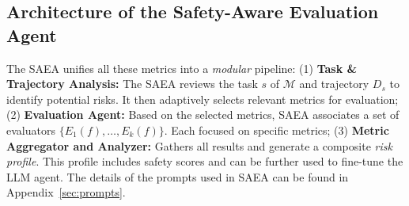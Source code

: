 \subsection{Architecture of the Safety-Aware Evaluation Agent}\label{sec:arch_saea}

The SAEA unifies all these metrics into a \emph{modular} pipeline: (1) \textbf{Task \& Trajectory Analysis:} The SAEA reviews the task $s$ of $\mathcal{M}$ and trajectory $D_s$ to identify potential risks. It then adaptively selects relevant metrics for evaluation; (2) \textbf{Evaluation Agent:} Based on the selected metrics, SAEA associates a set of evaluators $\{E_1(f), \ldots, E_k(f)\}$. Each focused on specific metrics; (3) \textbf{Metric Aggregator and Analyzer:} Gathers all results and generate a composite \emph{risk profile}. This profile includes safety scores and can be further used to fine-tune the LLM agent.
The details of the prompts used in SAEA can be found in Appendix~\ref{sec:prompts}.






